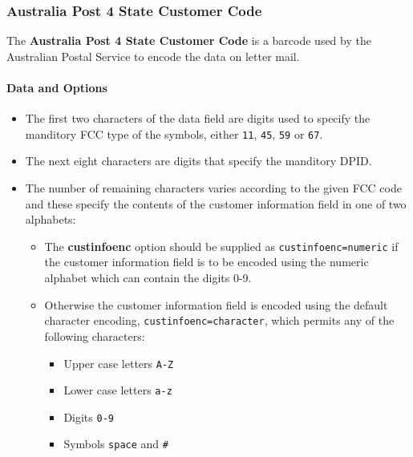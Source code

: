 \hypertarget{australia-post-4-state-customer-code}{%
\subsubsection{Australia Post 4 State Customer
Code}\label{australia-post-4-state-customer-code}}

The \textbf{Australia Post 4 State Customer Code} is a barcode used by
the Australian Postal Service to encode the data on letter mail.

\hypertarget{data-and-options-42}{%
\paragraph{Data and Options}\label{data-and-options-42}}

\begin{itemize}
\tightlist
\item
  The first two characters of the data field are digits used to specify
  the manditory FCC type of the symbols, either \texttt{11},
  \texttt{45}, \texttt{59} or \texttt{67}.
\item
  The next eight characters are digits that specify the manditory DPID.
\item
  The number of remaining characters varies according to the given FCC
  code and these specify the contents of the customer information field
  in one of two alphabets:

  \begin{itemize}
  \tightlist
  \item
    The \textbf{custinfoenc} option should be supplied as
    \texttt{custinfoenc=numeric} if the customer information field is to
    be encoded using the numeric alphabet which can contain the digits
    0-9.
  \item
    Otherwise the customer information field is encoded using the
    default character encoding, \texttt{custinfoenc=character}, which
    permits any of the following characters:

    \begin{itemize}
    \tightlist
    \item
      Upper case letters \texttt{A-Z}
    \item
      Lower case letters \texttt{a-z}
    \item
      Digits \texttt{0-9}
    \item
      Symbols \texttt{space} and \texttt{\#}
    \end{itemize}
  \end{itemize}
\end{itemize}


